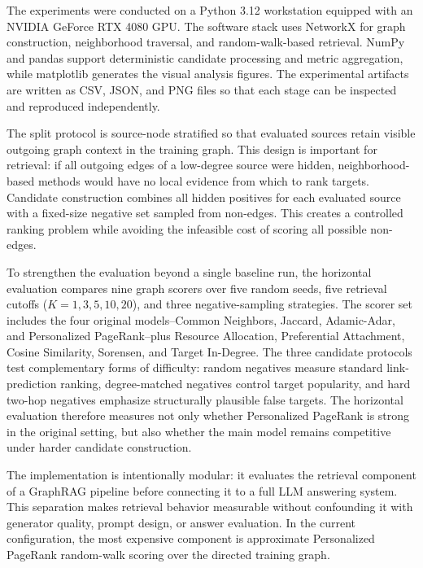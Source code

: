 \documentclass[10pt,twocolumn]{article}
\begin{document}
The experiments were conducted on a Python 3.12 workstation equipped with an NVIDIA GeForce RTX 4080 GPU. The software stack uses NetworkX for graph construction, neighborhood traversal, and random-walk-based retrieval. NumPy and pandas support deterministic candidate processing and metric aggregation, while matplotlib generates the visual analysis figures. The experimental artifacts are written as CSV, JSON, and PNG files so that each stage can be inspected and reproduced independently.

The split protocol is source-node stratified so that evaluated sources retain visible outgoing graph context in the training graph. This design is important for retrieval: if all outgoing edges of a low-degree source were hidden, neighborhood-based methods would have no local evidence from which to rank targets. Candidate construction combines all hidden positives for each evaluated source with a fixed-size negative set sampled from non-edges. This creates a controlled ranking problem while avoiding the infeasible cost of scoring all possible non-edges.

To strengthen the evaluation beyond a single baseline run, the horizontal evaluation compares nine graph scorers over five random seeds, five retrieval cutoffs ($K=1,3,5,10,20$), and three negative-sampling strategies. The scorer set includes the four original models--Common Neighbors, Jaccard, Adamic-Adar, and Personalized PageRank--plus Resource Allocation, Preferential Attachment, Cosine Similarity, Sorensen, and Target In-Degree. The three candidate protocols test complementary forms of difficulty: random negatives measure standard link-prediction ranking, degree-matched negatives control target popularity, and hard two-hop negatives emphasize structurally plausible false targets. The horizontal evaluation therefore measures not only whether Personalized PageRank is strong in the original setting, but also whether the main model remains competitive under harder candidate construction.

The implementation is intentionally modular: it evaluates the retrieval component of a GraphRAG pipeline before connecting it to a full LLM answering system. This separation makes retrieval behavior measurable without confounding it with generator quality, prompt design, or answer evaluation. In the current configuration, the most expensive component is approximate Personalized PageRank random-walk scoring over the directed training graph.
\end{document}
